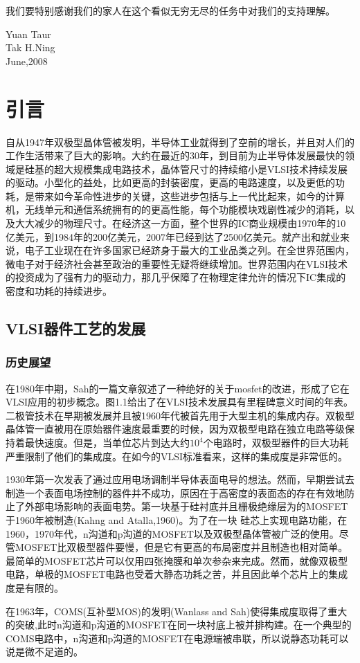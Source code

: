 \documentclass[cn,11pt,chinese]{elegantbook}
\begin{document}
我们要特别感谢我们的家人在这个看似无穷无尽的任务中对我们的支持理解。
\vskip 1.5cm

\begin{flushright}
	Yuan Taur\\
	Tak H.Ning\\
    June,2008
\end{flushright}

\tableofcontents
\mainmatter
\chapter{引言}
自从1947年双极型晶体管被发明，半导体工业就得到了空前的增长，并且对人们的工作生活带来了巨大的影响。大约在最近的30年，到目前为止半导体发展最快的领域是硅基的超大规模集成电路技术，晶体管尺寸的持续缩小是VLSI技术持续发展的驱动。小型化的益处，比如更高的封装密度，更高的电路速度，以及更低的功耗，是带来如今革命性进步的关键，这些进步包括与上一代比起来，如今的计算机，无线单元和通信系统拥有的的更高性能，每个功能模块戏剧性减少的消耗，以及大大减少的物理尺寸。在经济这一方面，整个世界的IC商业规模由1970年的10亿美元，到1984年的200亿美元，2007年已经到达了2500亿美元。就产出和就业来说，电子工业现在在许多国家已经跻身于最大的工业品类之列。在全世界范围内，微电子对于经济社会甚至政治的重要性无疑将继续增加。世界范围内在VLSI技术的投资成为了强有力的驱动力，那几乎保障了在物理定律允许的情况下IC集成的密度和功耗的持续进步。

\section{VLSI器件工艺的发展}
\subsection{历史展望}
在1980年中期，Sah的一篇文章叙述了一种绝好的关于mosfet的改进，形成了它在VLSI应用的初步概念。图1.1给出了在VLSI技术发展具有里程碑意义时间的年表。二极管技术在早期被发展并且被1960年代被首先用于大型主机的集成内存。双极型晶体管一直被用在原始器件速度最重要的时候，因为双极型电路在独立电路等级保持着最快速度。但是，当单位芯片到达大约$10^4$个电路时，双极型器件的巨大功耗严重限制了他们的集成度。在如今的VLSI标准看来，这样的集成度是非常低的。

1930年第一次发表了通过应用电场调制半导体表面电导的想法。然而，早期尝试去制造一个表面电场控制的器件并不成功，原因在于高密度的表面态的存在有效地防止了外部电场影响的表面电势。第一块基于硅衬底并且栅极绝缘层为的MOSFET于1960年被制造(Kahng and Atalla,1960)。为了在一块 硅芯上实现电路功能，在1960，1970年代，n沟道和p沟道的MOSFET以及双极型晶体管被广泛的使用。尽管MOSFET比双极型器件要慢，但是它有更高的布局密度并且制造也相对简单。最简单的MOSFET芯片可以仅用四张掩膜和单次参杂来完成。然而，就像双极型电路，单极的MOSFET电路也受着大静态功耗之苦，并且因此单个芯片上的集成度是有限的。

在1963年，COMS(互补型MOS)的发明(Wanlass and Sah)使得集成度取得了重大的突破,此时n沟道和p沟道的MOSFET在同一块衬底上被并排构建。在一个典型的COMS电路中，n沟道和p沟道的MOSFET在电源端被串联，所以说静态功耗可以说是微不足道的。
\end{document}
